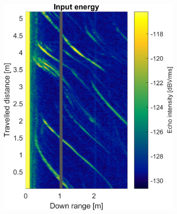 \begin{figure}[htbp]
    \centering
    \begin{subfigure}[t]{0.475\linewidth}
        \centering
        \includegraphics[width=\linewidth,max height=.475\textheight]{gfx/results/racetrack_input.png}
    \end{subfigure}%
    \hfill%
    \begin{subfigure}[t]{0.475\linewidth}
        \centering

\end{subfigure}
\end{figure}
